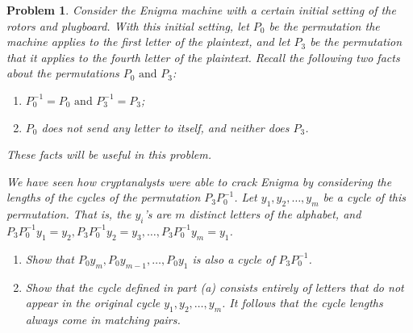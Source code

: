 \documentclass[12pt]{article}
\newtheorem{problem}{Problem}
\theoremstyle{remark}  %
\begin{document}
\vspace{5pt}
    \begin{problem}
        Consider the Enigma machine with a certain initial setting of the rotors and plugboard. With this initial setting, let $P_0$ be the permutation the machine applies to the first letter of the plaintext, and let $P_3$ be the permutation that it applies to the fourth letter of the plaintext. Recall the following two facts about the permutations $P_0\text{ and }P_3$:
        \begin{enumerate}[label=(\roman*)]
            \item $P_0^{-1}=P_0 \text{ and }P_3^{-1}=P_3$;
            \item $P_0$ does not send any letter to itself, and neither does $P_3$.
        \end{enumerate}
        These facts will be useful in this problem. \par We have seen how cryptanalysts were able to crack Enigma by considering the lengths of the cycles of the permutation $P_3P_0^{-1}$. Let $y_1,y_2,\dots,y_m$ be a cycle of this permutation. That is, the $y_i$'s are $m$ distinct letters of the alphabet, and $P_3P_0^{-1}y_1=y_2,P_3P_0^{-1}y_2=y_3,\dots,P_3P_0^{-1}y_m=y_1$.
        \begin{enumerate}
            \item Show that $P_0y_m,P_0y_{m-1},\dots,P_0y_1$ is also a cycle of $P_3P_0^{-1}$.
            \item Show that the cycle defined in part (a) consists entirely of letters that do not appear in the original cycle $y_1,y_2,\dots,y_m$. It follows that the cycle lengths always come in matching pairs.
        \end{enumerate}
    \end{problem}
\end{document}
